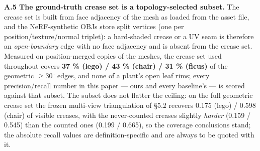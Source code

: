 \textbf{A.5 The ground-truth crease set is a topology-selected subset.} The crease set is
built from face adjacency of the mesh as loaded from the asset file, and the
NeRF-synthetic OBJs store split vertices (one per position/texture/normal triplet): a
hard-shaded crease or a UV seam is therefore an \emph{open-boundary} edge with no face
adjacency and is absent from the crease set. Measured on position-merged copies of the
meshes, the crease set used throughout covers \textbf{37 \% (lego) / 43 \% (chair) / 31 \% (ficus)}
of the geometric $\geq$30$^{\circ}$ edges, and none of a plant's open leaf rims; every precision/recall
number in this paper --- ours and every baseline's --- is scored against that subset. The
subset does not flatter the ceiling: on the full geometric crease set the frozen
multi-view triangulation of \S5.2 recovers 0.175 (lego) / 0.598 (chair) of visible
creases, with the never-counted creases slightly \emph{harder} (0.159 / 0.545) than the counted
ones (0.199 / 0.665), so the coverage conclusions stand; the absolute recall values are
definition-specific and are always to be quoted with it.

